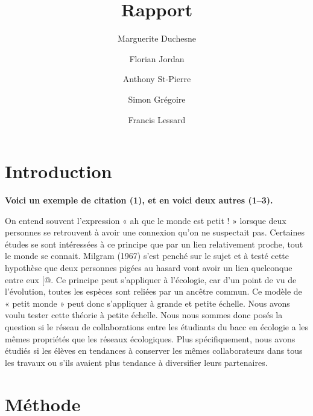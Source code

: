 \documentclass[9pt,twocolumn,twoside,]{pnas-new}
\title{Rapport}
\author[a]{Marguerite Duchesne}
\author[a]{Florian Jordan}
\author[a]{Anthony St-Pierre}
\author[a]{Simon Grégoire}
\author[a]{Francis Lessard}
\affil[a]{Université de Sherbrooke, Départment de biologie, 2500 Boulevard de
l'Université, Sherbrooke, Québec, J1K 2R1}
\begin{document}
\verticaladjustment{-2pt}



\maketitle
\thispagestyle{firststyle}


\acknow{}

\hypertarget{introduction}{%
\section{Introduction}\label{introduction}}

\textbf{Voici un exemple de citation (1), et en voici deux autres
(1--3).}

On entend souvent l'expression « ah que le monde est petit ! » lorsque
deux personnes se retrouvent à avoir une connexion qu'on ne suspectait
pas. Certaines études se sont intéressées à ce principe que par un lien
relativement proche, tout le monde se connait. Milgram (1967) s'est
penché sur le sujet et à testé cette hypothèse que deux personnes pigées
au hasard vont avoir un lien quelconque entre eux {[}@. Ce principe peut
s'appliquer à l'écologie, car d'un point de vu de l'évolution, toutes
les espèces sont reliées par un ancêtre commun. Ce modèle de « petit
monde » peut donc s'appliquer à grande et petite échelle. Nous avons
voulu tester cette théorie à petite échelle. Nous nous sommes donc posés
la question si le réseau de collaborations entre les étudiants du bacc
en écologie a les mêmes propriétés que les réseaux écologiques. Plus
spécifiquement, nous avons étudiés si les élèves en tendances à
conserver les mêmes collaborateurs dans tous les travaux ou s'ils
avaient plus tendance à diversifier leurs partenaires.

\hypertarget{muxe9thode}{%
\section{Méthode}\label{muxe9thode}}
\end{document}
